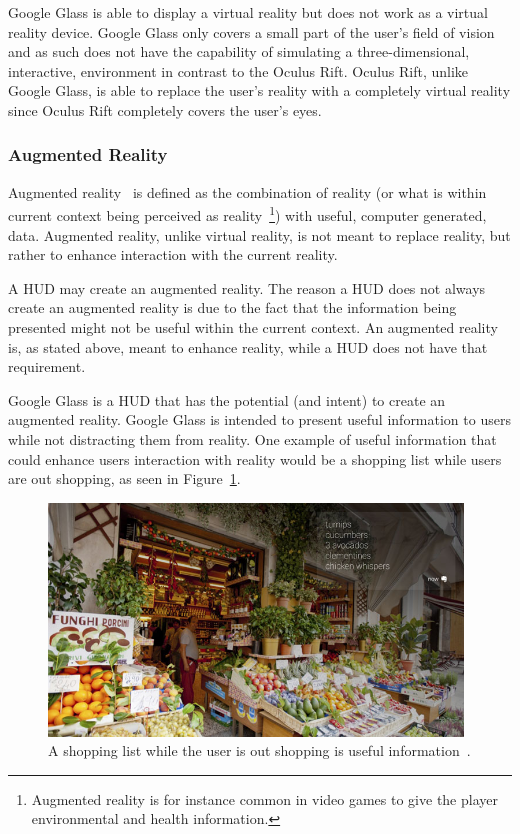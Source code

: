 Google Glass is able to display a virtual reality but does not work as a virtual reality device. Google Glass only covers a small part of the user's field of vision and as such does not have the capability of simulating a three-dimensional, interactive, environment in contrast to the Oculus Rift. Oculus Rift, unlike Google Glass, is able to replace the user's reality with a completely virtual reality since Oculus Rift completely covers the user's eyes.

\subsubsection{Augmented Reality}
\label{subsubsec:ar}
Augmented reality~\cite{augmentedRealityDef} is defined as the combination of reality (or what is within current context being perceived as reality~\footnote{Augmented reality is for instance common in video games to give the player environmental and health information.}) with useful, computer generated, data. Augmented reality, unlike virtual reality, is not meant to replace reality, but rather to enhance interaction with the current reality.

A HUD may create an augmented reality. The reason a HUD does not always create an augmented reality is due to the fact that the information being presented might not be useful within the current context. An augmented reality is, as stated above, meant to enhance reality, while a HUD does not have that requirement.

Google Glass is a HUD that has the potential (and intent) to create an augmented reality. Google Glass is intended to present useful information to users while not distracting them from reality. One example of useful information that could enhance users interaction with reality would be a shopping list while users are out shopping, as seen in Figure~\ref{GlassShopping}.

	\begin{figure}[ht!]
		\centering
		\includegraphics[width=110mm]{images/GoogleGlassKeepRevelant}
		\caption{A shopping list while the user is out shopping is useful information~\cite{glassDesignPrinciples}.}
		\label{GlassShopping}
	\end{figure}
	
